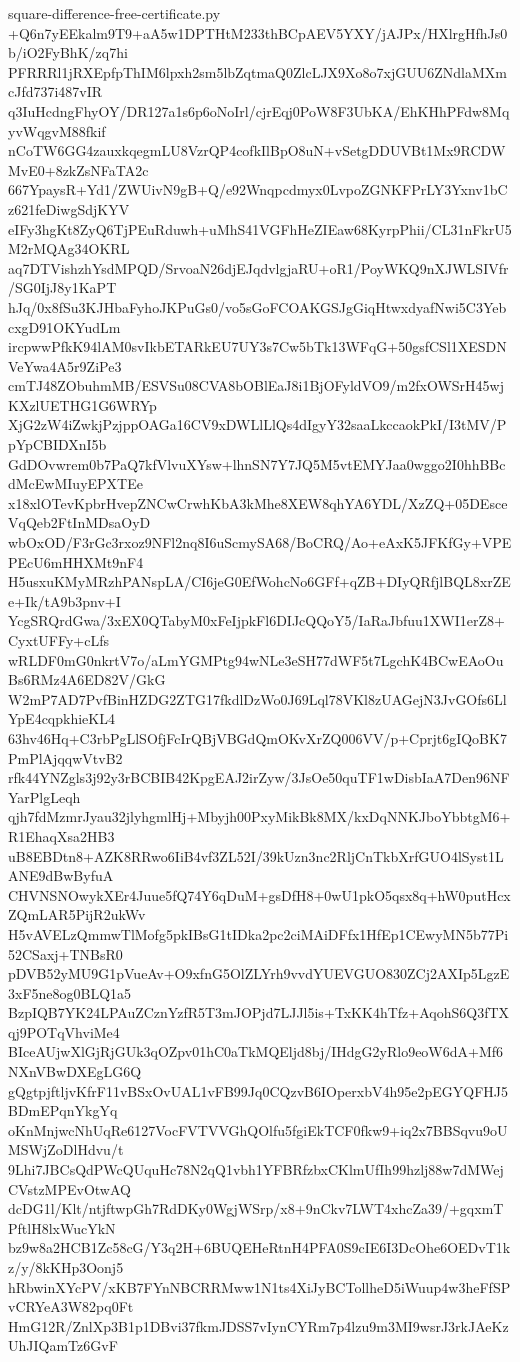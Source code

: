 \documentclass[11pt]{article}
\theoremstyle{definition}
\theoremstyle{remark}
\begin{document}
\begin{filecontents*}[overwrite]{square-difference-free-certificate.py}
+Q6n7yEEkalm9T9+aA5w1DPTHtM233thBCpAEV5YXY/jAJPx/HXlrgHfhJs0b/iO2FyBhK/zq7hi
PFRRRl1jRXEpfpThIM6lpxh2sm5lbZqtmaQ0ZlcLJX9Xo8o7xjGUU6ZNdlaMXmcJfd737i487vIR
q3IuHcdngFhyOY/DR127a1s6p6oNoIrl/cjrEqj0PoW8F3UbKA/EhKHhPFdw8MqyvWqgvM88fkif
nCoTW6GG4zauxkqegmLU8VzrQP4cofkIlBpO8uN+vSetgDDUVBt1Mx9RCDWMvE0+8zkZsNFaTA2c
667YpaysR+Yd1/ZWUivN9gB+Q/e92Wnqpcdmyx0LvpoZGNKFPrLY3Yxnv1bCz621feDiwgSdjKYV
eIFy3hgKt8ZyQ6TjPEuRduwh+uMhS41VGFhHeZIEaw68KyrpPhii/CL31nFkrU5M2rMQAg34OKRL
aq7DTVishzhYsdMPQD/SrvoaN26djEJqdvlgjaRU+oR1/PoyWKQ9nXJWLSIVfr/SG0IjJ8y1KaPT
hJq/0x8fSu3KJHbaFyhoJKPuGs0/vo5sGoFCOAKGSJgGiqHtwxdyafNwi5C3YebcxgD91OKYudLm
ircpwwPfkK94lAM0svIkbETARkEU7UY3s7Cw5bTk13WFqG+50gsfCSl1XESDNVeYwa4A5r9ZiPe3
cmTJ48ZObuhmMB/ESVSu08CVA8bOBlEaJ8i1BjOFyldVO9/m2fxOWSrH45wjKXzlUETHG1G6WRYp
XjG2zW4iZwkjPzjppOAGa16CV9xDWLlLlQs4dIgyY32saaLkccaokPkI/I3tMV/PpYpCBIDXnI5b
GdDOvwrem0b7PaQ7kfVlvuXYsw+lhnSN7Y7JQ5M5vtEMYJaa0wggo2I0hhBBcdMcEwMIuyEPXTEe
x18xlOTevKpbrHvepZNCwCrwhKbA3kMhe8XEW8qhYA6YDL/XzZQ+05DEsceVqQeb2FtInMDsaOyD
wbOxOD/F3rGc3rxoz9NFl2nq8I6uScmySA68/BoCRQ/Ao+eAxK5JFKfGy+VPEPEcU6mHHXMt9nF4
H5usxuKMyMRzhPANspLA/CI6jeG0EfWohcNo6GFf+qZB+DIyQRfjlBQL8xrZEe+Ik/tA9b3pnv+I
YcgSRQrdGwa/3xEX0QTabyM0xFeIjpkFl6DIJcQQoY5/IaRaJbfuu1XWI1erZ8+CyxtUFFy+cLfs
wRLDF0mG0nkrtV7o/aLmYGMPtg94wNLe3eSH77dWF5t7LgchK4BCwEAoOuBs6RMz4A6ED82V/GkG
W2mP7AD7PvfBinHZDG2ZTG17fkdlDzWo0J69Lql78VKl8zUAGejN3JvGOfs6LlYpE4cqpkhieKL4
63hv46Hq+C3rbPgLlSOfjFcIrQBjVBGdQmOKvXrZQ006VV/p+Cprjt6gIQoBK7PmPlAjqqwVtvB2
rfk44YNZgls3j92y3rBCBIB42KpgEAJ2irZyw/3JsOe50quTF1wDisbIaA7Den96NFYarPlgLeqh
qjh7fdMzmrJyau32jlyhgmlHj+Mbyjh00PxyMikBk8MX/kxDqNNKJboYbbtgM6+R1EhaqXsa2HB3
uB8EBDtn8+AZK8RRwo6IiB4vf3ZL52I/39kUzn3nc2RljCnTkbXrfGUO4lSyst1LANE9dBwByfuA
CHVNSNOwykXEr4Juue5fQ74Y6qDuM+gsDfH8+0wU1pkO5qsx8q+hW0putHcxZQmLAR5PijR2ukWv
H5vAVELzQmmwTlMofg5pkIBsG1tIDka2pc2ciMAiDFfx1HfEp1CEwyMN5b77Pi52CSaxj+TNBsR0
pDVB52yMU9G1pVueAv+O9xfnG5OlZLYrh9vvdYUEVGUO830ZCj2AXIp5LgzE3xF5ne8og0BLQ1a5
BzpIQB7YK24LPAuZCznYzfR5T3mJOPjd7LJJl5is+TxKK4hTfz+AqohS6Q3fTXqj9POTqVhviMe4
BIceAUjwXlGjRjGUk3qOZpv01hC0aTkMQEljd8bj/IHdgG2yRlo9eoW6dA+Mf6NXnVBwDXEgLG6Q
gQgtpjftljvKfrF11vBSxOvUAL1vFB99Jq0CQzvB6IOperxbV4h95e2pEGYQFHJ5BDmEPqnYkgYq
oKnMnjwcNhUqRe6127VocFVTVVGhQOlfu5fgiEkTCF0fkw9+iq2x7BBSqvu9oUMSWjZoDlHdvu/t
9Lhi7JBCsQdPWcQUquHc78N2qQ1vbh1YFBRfzbxCKlmUfIh99hzlj88w7dMWejCVstzMPEvOtwAQ
dcDG1l/Klt/ntjftwpGh7RdDKy0WgjWSrp/x8+9nCkv7LWT4xhcZa39/+gqxmTPftlH8lxWucYkN
bz9w8a2HCB1Zc58cG/Y3q2H+6BUQEHeRtnH4PFA0S9cIE6I3DcOhe6OEDvT1kz/y/8kKHp3Oonj5
hRbwinXYcPV/xKB7FYnNBCRRMww1N1ts4XiJyBCTollheD5iWuup4w3heFfSPvCRYeA3W82pq0Ft
HmG12R/ZnlXp3B1p1DBvi37fkmJDSS7vIynCYRm7p4lzu9m3MI9wsrJ3rkJAeKzUhJIQamTz6GvF

\end{filecontents*}
\end{document}
